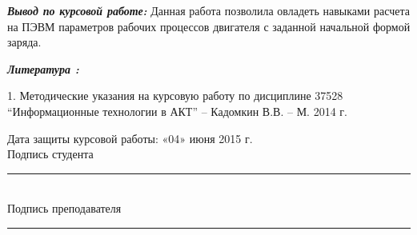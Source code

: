 \begin{large}
\textbf{\textit{Вывод по курсовой работе:}} Данная работа позволила овладеть навыками расчета на ПЭВМ параметров рабочих процессов двигателя с заданной начальной формой заряда. 

\begin{center}
\textbf{\textit{Литература :}}\\
\end{center}
1. Методические указания на курсовую работу по дисциплине 37528 “Информационные технологии в АКТ” – Кадомкин В.В. – М. 2014 г.
\begin{flushright}
Дата защиты курсовой работы: «04» июня 2015 г.\\
Подпись студента\rule{4cm}{0.01pt} \\
Подпись преподавателя\rule{4cm}{0.01pt} \\
\end{flushright}
\end{large}
